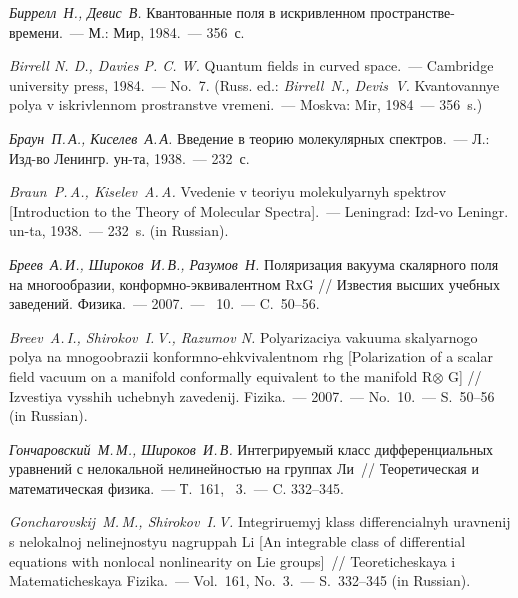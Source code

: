 \documentclass{crm-article}
\begin{document}
\begin{thebibliography}{99}


 {\it Биррелл~Н., Девис~В.}
    Квантованные поля в искривленном пространстве-времени.~--- М.:
    Мир, 1984.~--- 356~с.\\
{\footnotesize {\em Birrell N. D., Davies P. C. W.} Quantum fields in curved space.~--- Cambridge university press, 1984.~--- No.~7.
(Russ. ed.: {\it Birrell~N., Devis~V.}
    Kvantovannye polya v iskrivlennom prostranstve vremeni.~--- Moskva:
    Mir, 1984~--- 356~s.) \par}

 {\it Браун~П.\,А., Киселев~А.\,А.}
    Введение в теорию молекулярных спектров.~--- Л.: Изд-во Ленингр.
    ун-та, 1938.~--- 232~с.
\\
{\footnotesize{\it Braun~P.\,A., Kiselev~A.\,A.}
    Vvedenie v teoriyu molekulyarnyh spektrov [Introduction to the Theory of Molecular Spectra].~--- Leningrad: Izd-vo Leningr.
    un-ta, 1938.~--- 232~s. (in Russian).\par}

 {\it Бреев~А.\,И., Широков~И.\,В.,
    Разумов~Н.} Поляризация вакуума скалярного поля на многообразии,
    конформно-эквивалентном RхG // Известия высших учебных заведений.
    Физика.~--- 2007.~--- \No~10.~--- C.~50--56.
\\
{\footnotesize{\it Breev~A.\,I.,
    Shirokov~I.\,V., Razumov N.} Polyarizaciya vakuuma skalyarnogo
    polya na mnogoobrazii konformno-ehkvivalentnom rhg [Polarization
    of a scalar field vacuum on a manifold conformally equivalent to
    the manifold R$\otimes$ G] // Izvestiya
    vysshih uchebnyh zavedenij. Fizika.~--- 2007.~--- No.~10.~--- S.~50--56 (in Russian).\par}

 {\it Гончаровский~М.\,М.,
    Широков~И.\,В.} Интегрируемый класс дифференциальных уравнений с
    нелокальной нелинейностью на группах Ли~// Теоретическая и
    математическая физика.~--- Т.~161, \No~3.~--- C. 332--345.
\\
{\footnotesize{\it Goncharovskij~M.\,M., Shirokov~I.\,V.} Integriruemyj klass differencialnyh uravnenij s
    nelokalnoj nelinejnostyu nagruppah Li [An integrable class of
    differential equations with nonlocal nonlinearity on Lie groups]~// Teoreticheskaya i
    Matematicheskaya Fizika.~--- Vol.~161, No.~3.~--- S.~332--345 (in Russian).\par}




\end{thebibliography}
\end{document}
